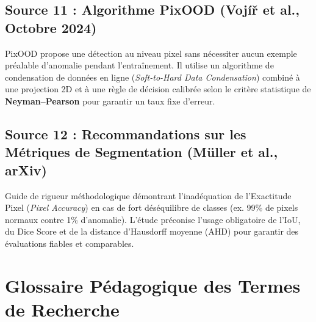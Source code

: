 \documentclass[11pt,a4paper]{article} \usepackage[utf8]{inputenc} \usepackage[T1]{fontenc}
\begin{document}
\subsection{Source 11 : Algorithme PixOOD (Vojíř et al., Octobre 2024) \cite{pixood2024}}
PixOOD propose une détection au niveau pixel sans nécessiter aucun exemple préalable d'anomalie pendant
l'entraînement. Il utilise un algorithme de condensation de données en ligne (\emph{Soft-to-Hard Data
Condensation}) combiné à une projection 2D et à une règle de décision calibrée selon le critère
statistique de \textbf{Neyman--Pearson} pour garantir un taux fixe d'erreur.
\subsection{Source 12 : Recommandations sur les Métriques de Segmentation (Müller et al., arXiv) \cite{muller2024}}
Guide de rigueur méthodologique démontrant l'inadéquation de l'Exactitude Pixel (\emph{Pixel Accuracy}) en cas de fort déséquilibre de classes (ex. 99\% de pixels normaux contre 1\% d'anomalie). L'étude préconise l'usage obligatoire de l'IoU, du Dice Score et de la distance d'Hausdorff moyenne (AHD) pour garantir des évaluations fiables et comparables.
\section{Glossaire Pédagogique des Termes de Recherche}
\end{document}
